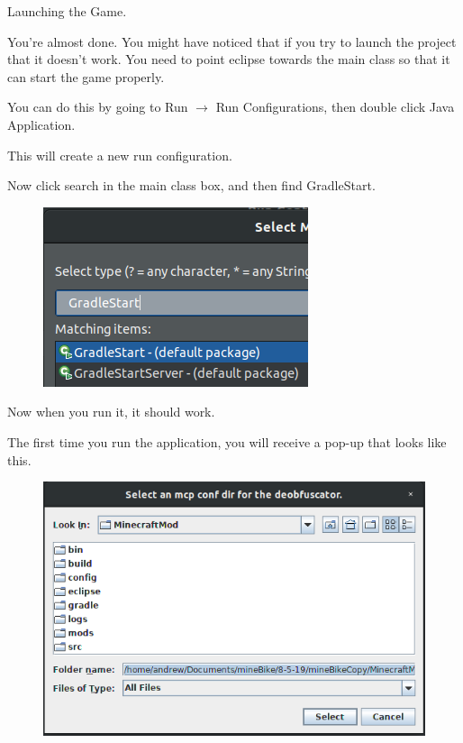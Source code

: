 \documentclass[12pt]{article}
\begin{document}
\begin{steps}
  \item Launching the Game.

	  You're almost done. You might have noticed that if you try to launch the project that it doesn't work. You need to point eclipse towards the main class so that it can start the game properly.

	  You can do this by going to Run $\rightarrow$ Run Configurations, then double click Java Application.

	  This will create a new run configuration.
	  
	  Now click search in the main class box, and then find GradleStart.

	\begin{figure}[H]
		\includegraphics[scale=0.6]{images/setup/GradleStart.png}
		\centering
	\end{figure}

	Now when you run it, it should work. 

	The first time you run the application, you will receive a pop-up that looks like this.

	\begin{figure}[H]
		\includegraphics[scale=0.5]{images/setup/PopUp.png}
		\centering
	\end{figure}


\end{steps}
\end{document}
